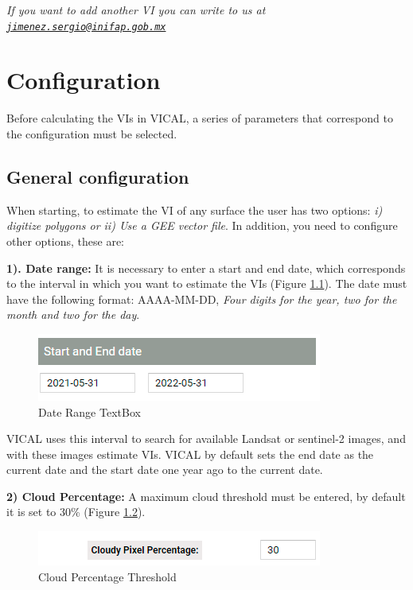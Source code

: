 \documentclass[
]{book}
\begin{document}
\emph{If you want to add another VI you can write to us at \href{mailto:jimenez.sergio@inifap.gob.mx}{\nolinkurl{jimenez.sergio@inifap.gob.mx}}}

\hypertarget{configuration}{%
\chapter{Configuration}\label{configuration}}

Before calculating the VIs in VICAL, a series of parameters that correspond to the configuration must be selected.

\hypertarget{general-configuration}{%
\section{General configuration}\label{general-configuration}}

When starting, to estimate the VI of any surface the user has two options: \emph{i) digitize polygons or ii) Use a GEE vector file}. In addition, you need to configure other options, these are:

\textbf{1). Date range: } It is necessary to enter a start and end date, which corresponds to the interval in which you want to estimate the VIs (Figure \ref{fig:figG1}). The date must have the following format: AAAA-MM-DD, \emph{Four digits for the year, two for the month and two for the day}.

\begin{figure}

{\centering \includegraphics{./images/Figure1} 

}

\caption{Date Range TextBox}\label{fig:figG1}
\end{figure}

VICAL uses this interval to search for available Landsat or sentinel-2 images, and with these images estimate VIs. VICAL by default sets the end date as the current date and the start date one year ago to the current date.

\textbf{2) Cloud Percentage: } A maximum cloud threshold must be entered, by default it is set to 30\% (Figure \ref{fig:figG2}).

\begin{figure}

{\centering \includegraphics{./images/Figure2} 

}

\caption{Cloud Percentage Threshold}\label{fig:figG2}
\end{figure}
\end{document}
